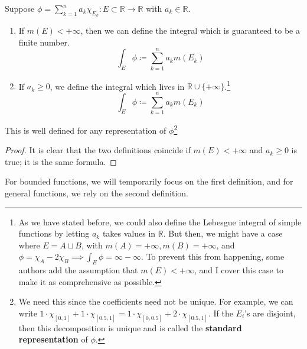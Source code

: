   \begin{definition}
    Suppose $\phi = \sum_{k=1}^n a_k \chi_{E_k}: E \subset \mathbb{R} \to \mathbb{R}$ with $a_k \in \mathbb{R}$. 
    \begin{enumerate}
      \item If $m(E) < +\infty$, then we can define the integral which is guaranteed to be a finite number.  
      \begin{equation}
        \int_E \phi \coloneqq \sum_{k=1}^n a_k m(E_k)
      \end{equation} 

      \item If $a_k \geq 0$, we define the integral which lives in $\mathbb{R} \cup \{+\infty\}$.\footnote{As we have stated before, we could also define the Lebesgue integral of simple functions by letting $a_k$ takes values in $\mathbb{R}$. But then, we might have a case where $E = A \sqcup B$, with $m(A) = +\infty, m(B) = +\infty$, and $\phi = \chi_{A} - 2 \chi_{B} \implies \int_E \phi = \infty - \infty$. To prevent this from happening, some authors add the assumption that $m(E) < +\infty$, and I cover this case to make it as comprehensive as possible. }
      \begin{equation}
        \int_E \phi \coloneqq \sum_{k=1}^n a_k m(E_k)
      \end{equation} 
    \end{enumerate}
    This is well defined for any representation of $\phi$\footnote{We need this since the coefficients need not be unique. For example, we can write $1 \cdot \chi_{[0, 1]} + 1 \cdot \chi_{[0.5, 1]} = 1 \cdot \chi_{[0, 0.5]} + 2 \cdot \chi_{[0.5, 1]}$. If the $E_i$'s are disjoint, then this decomposition is unique and is called the \textbf{standard representation} of $\phi$. } 
  \end{definition} 
  \begin{proof}
    It is clear that the two definitions coincide if $m(E) < +\infty$ and $a_k \geq 0$ is true; it is the same formula.  
  \end{proof} 

  For bounded functions, we will temporarily focus on the first definition, and for general functions, we rely on the second definition. 

